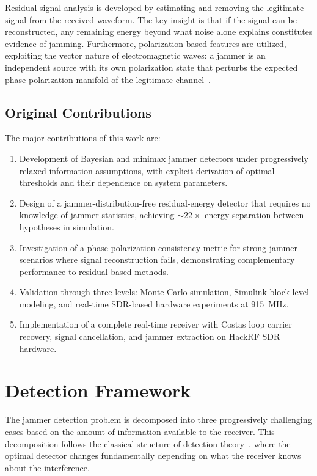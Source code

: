 \documentclass[conference]{IEEEtran}
\begin{document}
Residual-signal analysis is developed by estimating and removing the legitimate signal from the received waveform. The key insight is that if the signal can be reconstructed, any remaining energy beyond what noise alone explains constitutes evidence of jamming. Furthermore, polarization-based features are utilized, exploiting the vector nature of electromagnetic waves: a jammer is an independent source with its own polarization state that perturbs the expected phase-polarization manifold of the legitimate channel~\cite{born1999,lee1986}.

\subsection{Original Contributions}

The major contributions of this work are:
\begin{enumerate}
\item Development of Bayesian and minimax jammer detectors under progressively relaxed information assumptions, with explicit derivation of optimal thresholds and their dependence on system parameters.
\item Design of a jammer-distribution-free residual-energy detector that requires no knowledge of jammer statistics, achieving ${\sim}22\times$ energy separation between hypotheses in simulation.
\item Investigation of a phase-polarization consistency metric for strong jammer scenarios where signal reconstruction fails, demonstrating complementary performance to residual-based methods.
\item Validation through three levels: Monte Carlo simulation, Simulink block-level modeling, and real-time SDR-based hardware experiments at 915~MHz.
\item Implementation of a complete real-time receiver with Costas loop carrier recovery, signal cancellation, and jammer extraction on HackRF SDR hardware.
\end{enumerate}

\section{Detection Framework}

The jammer detection problem is decomposed into three progressively challenging cases based on the amount of information available to the receiver. This decomposition follows the classical structure of detection theory~\cite{kay1998,vantrees2001}, where the optimal detector changes fundamentally depending on what the receiver knows about the interference.
\end{document}
